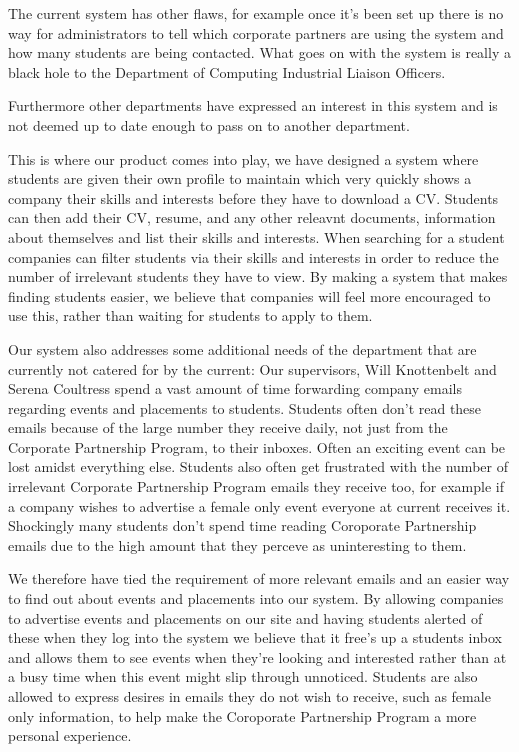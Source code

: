 \documentclass{article}
\begin{document}
The current system has other flaws, for example once it's been set up there is no way for administrators to tell which corporate partners are using the system and how many students are being contacted. What goes on with the system is really a black hole to the Department of Computing Industrial Liaison Officers. 

Furthermore other departments have expressed an interest in this system and is not deemed up to date enough to pass on to another department.

This is where our product comes into play, we have designed a system where students are given their own profile to maintain which very quickly shows a company their skills and interests before they have to download a CV. Students can then add their CV, resume, and any other releavnt documents, information about themselves and list their skills and interests.
When searching for a student companies can filter students via their skills and interests in order to reduce the number of irrelevant students they have to view. By making a system that makes finding students easier, we believe that companies will feel more encouraged to use this, rather than waiting 
for students to apply to them.

Our system also addresses some additional needs of the department that are currently not catered for by the current:
Our supervisors, Will Knottenbelt and Serena Coultress spend a vast amount of time forwarding company emails regarding events and placements to students.
Students often don't read these emails because of the large number they receive daily, not just from the Corporate Partnership Program, to their inboxes. Often an exciting event can be lost amidst everything else. Students also often get frustrated with the number of irrelevant Corporate Partnership Program emails they receive too, for example if a company wishes to advertise a female only event everyone at current receives it.
Shockingly many students don't spend time reading Coroporate Partnership emails due to the high amount that they perceve as uninteresting to them.

We therefore have tied the requirement of more relevant emails and an easier way to find out about events and placements into our system. By allowing companies to advertise events and placements on our site and having students alerted of these when they log into the system we believe that it free's
up a students inbox and allows them to see events when they're looking and interested rather than at a busy time when this event might slip through
unnoticed.
Students are also allowed to express desires in emails they do not wish to receive, such as female only information, to help make the Coroporate Partnership Program a more personal experience. 
\end{document}
